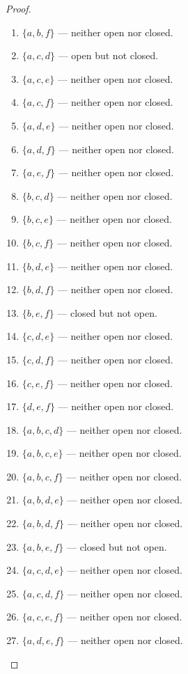 \begin{proof}
\begin{enumerate}[label={(\arabic*)}]
        \item $\{ a, b, f \}$ --- neither open nor closed.
        \item $\{ a, c, d \}$ --- open but not closed.
        \item $\{ a, c, e \}$ --- neither open nor closed.
        \item $\{ a, c, f \}$ --- neither open nor closed.
        \item $\{ a, d, e \}$ --- neither open nor closed.
        \item $\{ a, d, f \}$ --- neither open nor closed.
        \item $\{ a, e, f \}$ --- neither open nor closed.
        \item $\{ b, c, d \}$ --- neither open nor closed.
        \item $\{ b, c, e \}$ --- neither open nor closed.
        \item $\{ b, c, f \}$ --- neither open nor closed.
        \item $\{ b, d, e \}$ --- neither open nor closed.
        \item $\{ b, d, f \}$ --- neither open nor closed.
        \item $\{ b, e, f \}$ --- closed but not open.
        \item $\{ c, d, e \}$ --- neither open nor closed.
        \item $\{ c, d, f \}$ --- neither open nor closed.
        \item $\{ c, e, f \}$ --- neither open nor closed.
        \item $\{ d, e, f \}$ --- neither open nor closed.
        \item $\{ a, b, c, d \}$ --- neither open nor closed.
        \item $\{ a, b, c, e \}$ --- neither open nor closed.
        \item $\{ a, b, c, f \}$ --- neither open nor closed.
        \item $\{ a, b, d, e \}$ --- neither open nor closed.
        \item $\{ a, b, d, f \}$ --- neither open nor closed.
        \item $\{ a, b, e, f \}$ --- closed but not open.
        \item $\{ a, c, d, e \}$ --- neither open nor closed.
        \item $\{ a, c, d, f \}$ --- neither open nor closed.
        \item $\{ a, c, e, f \}$ --- neither open nor closed.
        \item $\{ a, d, e, f \}$ --- neither open nor closed.

\end{enumerate}
\end{proof}
